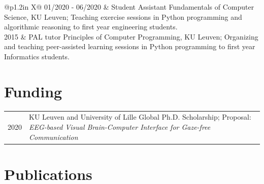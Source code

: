 \documentclass[10pt,a4paper]{article}
\begin{document}
    \begin{tabularx}{\linewidth}{@{}p{1.2in} X@{}}
        01/2020 - 06/2020 & Student Assistant Fundamentals of Computer Science, KU Leuven; Teaching exercise sessions
        in Python
        programming and algorithmic reasoning to first year engineering students. \\
        2015 & PAL tutor Principles of Computer Programming, KU Leuven; Organizing and teaching peer-assisted
        learning sessions in Python programming to first year Informatics students. \\
    \end{tabularx}


    \section*{Funding}

    \begin{tabularx}{\linewidth}{@{}p{1.2in} X@{}}
        2020 & KU Leuven and University of Lille Global Ph.D. Scholarship; Proposal: \textit{EEG-based Visual
        Brain-Computer Interface for Gaze-free Communication} \\

    \end{tabularx}

    \section*{Publications}


    \nocite{*}

    \printbibliography[heading=none]
\end{document}
